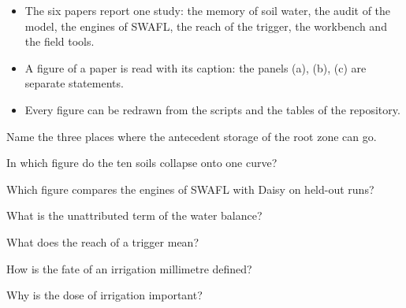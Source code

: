 \par\vspace{6pt}\noindent{}\par\nobreak
{}\label{fig:a22_54}
\par\vspace{6pt}\noindent{}\par\nobreak
{}\label{fig:a22_55}
\par\vspace{6pt}\noindent{}\par\nobreak
{}\label{fig:a22_56}
\begin{itemize}\item The six papers report one study: the memory of soil water, the audit of the model, the engines of SWAFL, the reach of the trigger, the workbench and the field tools.\item A figure of a paper is read with its caption: the panels (a), (b), (c) are separate statements.\item Every figure can be redrawn from the scripts and the tables of the repository.\end{itemize}
\begin{exlist}\item Name the three places where the antecedent storage of the root zone can go. \item In which figure do the ten soils collapse onto one curve? \item Which figure compares the engines of SWAFL with Daisy on held-out runs? \end{exlist}
\begin{exlist}\item What is the unattributed term of the water balance?\item What does the reach of a trigger mean?\item How is the fate of an irrigation millimetre defined?\item Why is the dose of irrigation important?\end{exlist}
